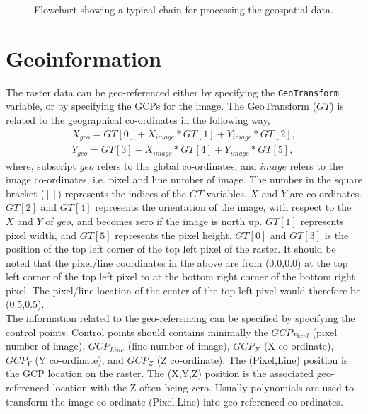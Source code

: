 \documentclass[10pt]{book}
\begin{document}
{\begin{figure}[h]
\begin{center}
  \caption{Flowchart showing a typical chain for processing the geospatial data.}
  \label{fig:flowchart_geo}
 \end{center}
\end{figure}

\section{Geoinformation}
The raster data can be geo-referenced  either by specifying the \verb"GeoTransform" variable, or by specifying the GCPs for the image. The GeoTransform ($GT$) is related to the geographical co-ordinates in the following way,
\begin{eqnarray}
X_{geo} = GT[0] + X_{image}*GT[1] + Y_{image}*GT[2], \\
Y_{geo} = GT[3] + X_{image}*GT[4] + Y_{image}*GT[5],
\end{eqnarray}
where, subscript $geo$ refers to the global co-ordinates, and $image$ refers to the image co-ordinates, i.e. pixel and line number of image. The number in the square bracket ($[]$) represents the indices of the $GT$ variables. $X$ and $Y$ are co-ordinates. $GT[2]$ and $GT[4]$ represents the orientation of the image, with respect to the $X$ and $Y$ of $geo$, and becomes zero if the image is north up. $GT[1]$ represents pixel width, and $GT[5]$ represents the pixel height. $GT[0]$ and $GT[3]$ is the position of the  top left corner of the top left pixel of the raster. It should be noted that the pixel/line coordinates in the above are from (0.0,0.0) at the top left corner of the top left pixel to at the bottom right corner of the bottom right pixel. The pixel/line location of the center of the top left pixel would therefore be (0.5,0.5).\\

The information related to the geo-referencing can be specified by specifying the control points. Control points should contains minimally the $GCP_{Pixel}$ (pixel number of image), $GCP_{Line}$ (line number of image), $GCP_X$ (X co-ordinate), $GCP_Y$ (Y co-ordinate), and $GCP_Z$ (Z co-ordinate). The (Pixel,Line) position is the GCP location on the raster. The (X,Y,Z) position is the associated geo-referenced location with the Z often being zero. Usually polynomials are used to transform the image co-ordinate (Pixel,Line) into geo-referenced co-ordinates. \\

}
\end{document}
